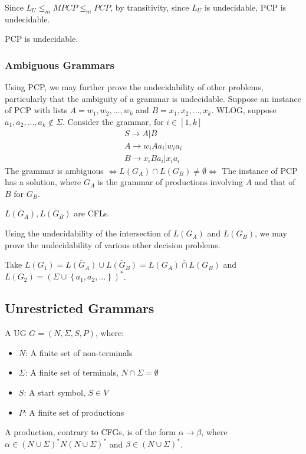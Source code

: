 Since $L_U\le _m MPCP \le _m PCP$, by transitivity, since $L_U$ is undecidable,
PCP is undecidable.
\begin{theorem}
  PCP is undecidable.
\end{theorem}

\subsubsection{Ambiguous Grammars}
Using PCP, we may further prove the undecidability of other problems, particularly
that the ambiguity of a grammar is undecidable. Suppose an instance of PCP with lists
$A=w_1,w_2,\ldots,w_k$ and $B=x_1,x_2,\ldots,x_k$. WLOG, suppose
$a_1,a_2,\ldots,a_k\not\in \Sigma$. Consider the grammar, for $i\in \left[ 1,k
\right] $
\begin{gather*}
  S\to A|B\\
  A\to w_iAa_i| w_ia_i\\
  B\to x_iBa_i| x_ia_i
\end{gather*}
The grammar is ambiguous $\iff L(G_A)\cap L(G_B)\neq \emptyset \iff$ The
instance of PCP has a solution, where $G_A$ is the grammar of productions
involving $A$ and that of $B$ for $G_B$.

\begin{remark}
  $\bar{L\left( G_A \right) },\bar{L\left( G_B \right) }$ are CFLs.
\end{remark}

Using the undecidability of the intersection of $L(G_A)$ and $L(G_B)$, we may
prove the undecidability of various other decision problems.
\begin{example}[$L(G_1)=L(G_2)$]
  Take $L(G_1)=\bar{L(G_A)}\cup \bar{L(G_B)}=\bar{L(G_A)\cap L(G_B)}$ and
  $L(G_2)={\left( \Sigma\cup \left\{ a_1,a_2,\ldots \right\}  \right)}^{*}$.
\end{example}

\subsection{Unrestricted Grammars}
\begin{definition}
  A UG $G=\left( N,\Sigma,S,P \right) $, where:
  \begin{itemize}
    \item $N$: A finite set of non-terminals
    \item $\Sigma$: A finite set of terminals, $N \cap \Sigma=\emptyset $
    \item $S$: A start symbol, $S\in V$ 
    \item $P$: A finite set of productions
  \end{itemize}
  A production, contrary to CFGs, is of the form $\alpha\to\beta$, where
  $\alpha\in {\left( N \cup \Sigma \right)}^{*}N{\left( N\cup \Sigma
  \right)}^{*}$ and $\beta\in {\left( N \cup \Sigma \right)}^{*}$.
\end{definition}

